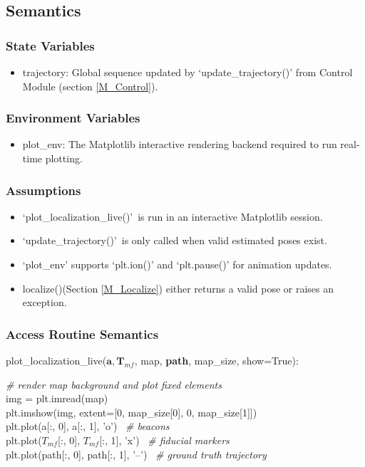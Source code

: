 \documentclass[12pt, titlepage]{article}
\begin{document}
\subsection{Semantics}

\subsubsection{State Variables}
\begin{itemize}
  \item trajectory: Global sequence updated by `update\_trajectory()' from Control Module (section \ref{M_Control}).
\end{itemize}

\subsubsection{Environment Variables}
\begin{itemize}
  \item plot\_env: The Matplotlib interactive rendering backend required to run real-time plotting.
\end{itemize}

\subsubsection{Assumptions}
\begin{itemize}
  \item \lq plot\_localization\_live()\rq~is run in an interactive Matplotlib session.
  \item \lq update\_trajectory()\rq~is only called when valid estimated poses exist.
  \item `plot\_env' supports `plt.ion()' and `plt.pause()' for animation updates.
  \item localize()(Section \ref{M_Localize}) either returns a valid pose or raises an exception.
\end{itemize}

\subsubsection{Access Routine Semantics}

\noindent plot\_localization\_live($\mathbf{a}, \mathbf{T}_{mf}$, map, \textbf{path}, map\_size, show=True):

\noindent \textit{\# render map background and plot fixed elements} \\
img = plt.imread(map) \\
plt.imshow(img, extent=[0, map\_size[0], 0, map\_size[1]]) \\
plt.plot(a[:, 0], a[:, 1], 'o') \ \textit{\# beacons} \\
plt.plot($T_{mf}$[:, 0], $T_{mf}$[:, 1], 'x') \ \textit{\# fiducial markers} \\
plt.plot(path[:, 0], path[:, 1], '--') \ \textit{\# ground truth trajectory} \\
\end{document}
